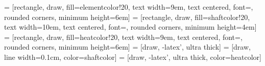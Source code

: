 \documentclass[landscape]{article}
\begin{document}
\pagestyle{empty}



 = [rectangle, draw, fill=elementcolor!20,
text width=9em, text centered, font=\LARGE, rounded corners, minimum height=6em]
 = [rectangle, draw, fill=shaftcolor!20,
text width=10em, text centered, font=\LARGE, rounded corners, minimum height=4em]
 = [rectangle, draw, fill=heatcolor!20,
text width=9em, text centered, font=\LARGE, rounded corners, minimum height=6em]
 = [draw, -latex', ultra thick]
 = [draw, line width=0.1cm, color=shaftcolor]
 = [draw, -latex', ultra thick, color=heatcolor]
\end{document}
